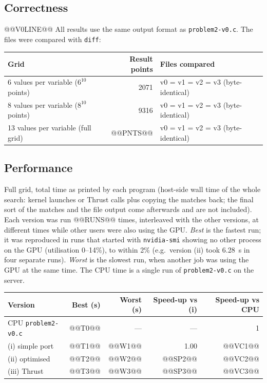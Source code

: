 \documentclass[11pt]{article}
\begin{document}
\subsection*{Correctness}
@@V0LINE@@
All results use the same output format as \texttt{problem2-v0.c}. The files
were compared with \texttt{diff}:
\begin{center}
\begin{tabular}{lrl}
\toprule
Grid & Result points & Files compared \\
\midrule
6 values per variable ($6^{10}$ points)  & 2071  & v0 = v1 = v2 = v3 (byte-identical) \\
8 values per variable ($8^{10}$ points)  & 9316  & v0 = v1 = v2 = v3 (byte-identical) \\
13 values per variable (full grid)       & @@PNTS@@ & v0 = v1 = v2 = v3 (byte-identical) \\
\bottomrule
\end{tabular}
\end{center}

\subsection*{Performance}
Full grid, total time as printed by each program (host-side wall time of the
whole search: kernel launches or Thrust calls plus copying the matches back;
the final sort of the matches and the file output come afterwards and are not
included). Each version was run @@RUNS@@ times, interleaved with the other
versions, at different times while other users were also using the GPU.
\emph{Best} is the fastest run; it was reproduced in runs that started with
\texttt{nvidia-smi} showing no other process on the GPU (utilisation 0--14\%),
to within 2\% (e.g.\ version (ii) took 6.28~s in four separate runs). \emph{Worst} is the slowest run, when another
job was using the GPU at the same time. The CPU time is a single run of
\texttt{problem2-v0.c} on the server.

\begin{center}
\begin{tabular}{lrrrr}
\toprule
Version & Best (s) & Worst (s) & Speed-up vs (i) & Speed-up vs CPU \\
\midrule
CPU \texttt{problem2-v0.c} & @@T0@@ & --- & --- & 1 \\
(i) simple port    & @@T1@@ & @@W1@@ & 1.00 & @@VC1@@ \\
(ii) optimised     & @@T2@@ & @@W2@@ & @@SP2@@ & @@VC2@@ \\
(iii) Thrust       & @@T3@@ & @@W3@@ & @@SP3@@ & @@VC3@@ \\
\bottomrule
\end{tabular}
\end{center}
\end{document}

